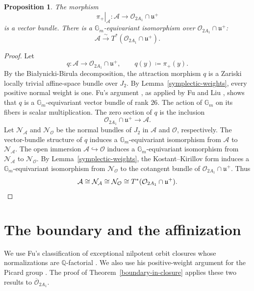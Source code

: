 \documentclass[12pt]{article}
\newtheorem{proposition}[theorem]{Proposition}
\theoremstyle{definition}
\begin{document}
\begin{proposition}\label{cotangent-open}
The morphism
\[
    \left.\pi_+\right|_{\mathcal A}:
    \mathcal A\longrightarrow\mathcal O_{2A_1}\cap\mathfrak u^+
\]
is a vector bundle. There is a \(\mathbb G_m\)-equivariant isomorphism over
\(\mathcal O_{2A_1}\cap\mathfrak u^+\):
\[
    \mathcal A\xrightarrow{\sim}
    T^*(\mathcal O_{2A_1}\cap\mathfrak u^+).
\]
\end{proposition}

\begin{proof}
Let
\[
    q:\mathcal A\longrightarrow\mathcal O_{2A_1}\cap\mathfrak u^+,
    \qquad
    q(y)\coloneqq\pi_+(y).
\]
By the Bia{\l}ynicki-Birula decomposition, the attraction morphism \(q\)
is a Zariski locally trivial affine-space bundle over \(J_2\). By
Lemma~\ref{symplectic-weights}, every positive normal weight is one. Fu's
argument \cite[Proof of Lemma~3.7]{FuSymplectic}, as applied by
Fu and Liu \cite[Proof of Theorem~4.2]{FuLiu}, shows that \(q\) is a
\(\mathbb G_m\)-equivariant vector bundle of rank \(26\). The action of
\(\mathbb G_m\) on its fibers is scalar multiplication. The zero section of \(q\)
is the inclusion
\[
    \mathcal O_{2A_1}\cap\mathfrak u^+
    \longrightarrow\mathcal A.
\]
Let \(\mathcal N_{\mathcal A}\) and \(\mathcal N_{\mathcal O}\) be the normal
bundles of \(J_2\) in \(\mathcal A\) and \(\mathcal O\), respectively. The
vector-bundle structure of \(q\) induces a \(\mathbb G_m\)-equivariant isomorphism
from \(\mathcal A\) to \(\mathcal N_{\mathcal A}\). The open immersion
\(\mathcal A\hookrightarrow\mathcal O\) induces a \(\mathbb G_m\)-equivariant
isomorphism from \(\mathcal N_{\mathcal A}\) to \(\mathcal N_{\mathcal O}\). By
Lemma~\ref{symplectic-weights}, the Kostant--Kirillov form induces a
\(\mathbb G_m\)-equivariant isomorphism from \(\mathcal N_{\mathcal O}\) to the
cotangent bundle of \(\mathcal O_{2A_1}\cap\mathfrak u^+\).
Thus
\[
    \mathcal A
    \cong\mathcal N_{\mathcal A}
    \cong\mathcal N_{\mathcal O}
    \cong T^*(\mathcal O_{2A_1}\cap\mathfrak u^+).
    \qedhere
\]
\end{proof}

\section{The boundary and the affinization}\label{boundary-section}

We use Fu's classification of exceptional nilpotent orbit closures whose
normalizations are \(\mathbb Q\)-factorial
\cite[Proposition~4.4]{FuQFactorial}. We also use his positive-weight
argument for the Picard group
\cite[Proof of Lemma~4.3]{FuQFactorial}. The proof of
Theorem~\ref{boundary-in-closure} applies these two results to
\(\overline{\mathcal O}_{2A_1}\).
\end{document}
